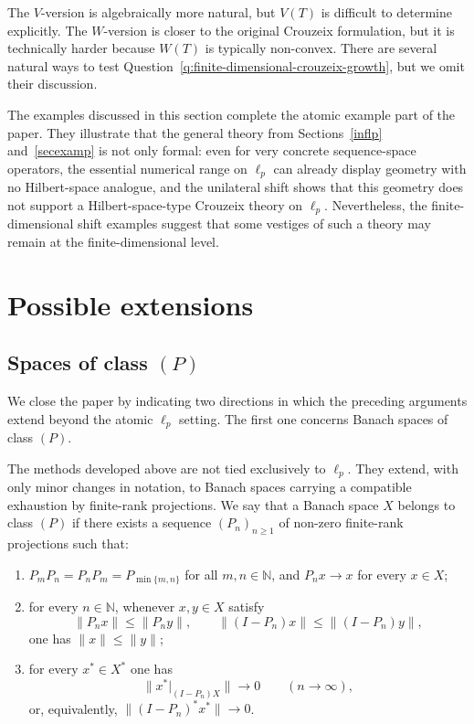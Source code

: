 \documentclass[11pt]{amsart}
\numberwithin{equation}{section}
\theoremstyle{definition}
\theoremstyle{remark}
\begin{document}
The $V$-version is algebraically more natural, but $V(T)$ is difficult to determine explicitly.  The $W$-version is closer to the original Crouzeix formulation, but it is technically harder because $W(T)$ is typically non-convex.
There are several natural ways to test Question~\ref{q:finite-dimensional-crouzeix-growth}, but we omit their discussion. 


The examples discussed in this section complete the atomic example part of the paper. They illustrate that the general theory from Sections~\ref{inflp} and~\ref{secexamp} is not only formal: even for very concrete sequence-space operators, the essential numerical range on $\ell_p$ can already display geometry with no Hilbert-space analogue, and the unilateral shift shows that this geometry does not support a Hilbert-space-type Crouzeix theory on $\ell_p$. Nevertheless, the finite-dimensional shift examples suggest that some vestiges of such a theory may remain at the finite-dimensional level.

\section{Possible extensions}\label{secexten}

\subsection{Spaces of class $(P)$}

We close the paper by indicating two directions in which the preceding arguments extend beyond the atomic $\ell_p$ setting. The first one concerns Banach spaces of class $(P)$.

The methods developed above are not tied exclusively to $\ell_p$.
They extend, with only minor changes in notation, to Banach spaces carrying a compatible
exhaustion by finite-rank projections. We say that a Banach space $X$ belongs to class $(P)$ if there exists a sequence $(P_n)_{n\ge1}$
of non-zero finite-rank projections such that:
\begin{enumerate}[label=\textup{(\roman*)}]
\item $P_mP_n=P_nP_m=P_{\min\{m,n\}}$ for all $m,n\in\mathbb N$, and $P_nx\to x$ for every $x\in X$;
\item for every \(n\in\mathbb N\), whenever \(x,y\in X\) satisfy
\[
        \|P_nx\|\le \|P_ny\|,
        \qquad
        \|(I-P_n)x\|\le \|(I-P_n)y\|,
\]
one has \(\|x\|\le \|y\|\);
\item for every $x^*\in X^*$ one has
\[
        \bigl\|x^*|_{(I-P_n)X}\bigr\|\to0
        \qquad (n\to\infty),
\]
or, equivalently, $\|(I-P_n)^*x^*\|\to0$.
\end{enumerate}
\end{document}
